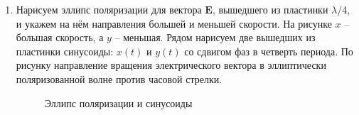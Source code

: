 \documentclass[a4paper,12pt]{article} %
\begin{document}
	\begin{enumerate}
		\item Нарисуем эллипс поляризации для вектора $\boldsymbol{E}$, вышедшего из пластинки $\lambda$/4, и укажем на нём направления большей и меньшей скорости. На рисунке $x$ -- большая скорость, а $y$ -- меньшая. Рядом нарисуем две вышедших из пластинки синусоиды: $x(t)$ и $y(t)$ со сдвигом фаз в четверть периода. По рисунку направление вращения электрического вектора в эллиптически поляризованной волне против часовой стрелки.
		
		\begin{figure}[h!]
			\begin{minipage}[h!]{0.49\linewidth}
			\end{minipage}
			\hfill
			\begin{minipage}[h!]{0.49\linewidth}
			\end{minipage}
			\caption{Эллипс поляризации и синусоиды}
		\end{figure}
	

\end{enumerate}
\end{document}
